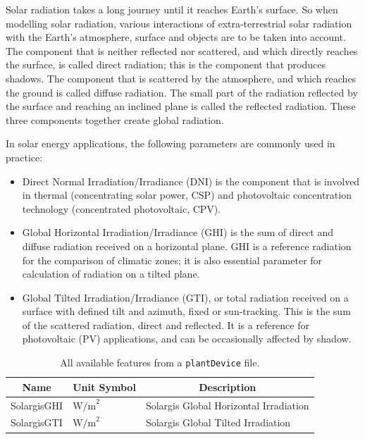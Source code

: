 Solar radiation takes a long journey until it reaches Earth’s surface. So when
modelling solar radiation, various interactions of extra-terrestrial solar
radiation with the Earth’s atmosphere, surface and objects are to be taken into
account. The component that is neither reflected nor scattered, and which
directly
reaches the surface, is called direct radiation; this is the component that
produces shadows. The component that is scattered by the atmosphere, and which
reaches the ground is called diffuse radiation. The small part of the radiation
reflected by the surface and reaching an inclined plane is called the reflected
radiation. These three components together create global radiation.

In solar energy applications, the following parameters are commonly used in
practice:

\begin{itemize}
	\item Direct Normal Irradiation/Irradiance (DNI) is the component that is
	      involved in thermal (concentrating solar power, CSP) and photovoltaic
	      concentration
	      technology (concentrated photovoltaic, CPV).
	\item  Global Horizontal
	      Irradiation/Irradiance (GHI) is the sum of direct and diffuse radiation
	      received on a horizontal plane. GHI is a reference radiation for the
	      comparison of climatic zones; it is also essential parameter for
	      calculation of radiation on a tilted plane.
	\item Global Tilted Irradiation/Irradiance (GTI), or total
	      radiation received on a surface with defined tilt and azimuth, fixed or
	      sun-tracking. This is the sum of the scattered radiation, direct and
	      reflected. It is a reference for photovoltaic (PV) applications, and
	      can be occasionally affected by shadow.
\end{itemize}


\begin{table}[H]
	\begin{center}
		\begin{tabular}[c]{l|l|l}
			\hline
			\multicolumn{1}{c|}{\textbf{Name}}        &
			\multicolumn{1}{c|}{\textbf{Unit Symbol}} &
			\multicolumn{1}{c}{\textbf{Description}}                                                            \\
			\hline
			SolargisGHI                               & $\text{W/m}^2$ & Solargis Global Horizontal Irradiation \\
			SolargisGTI                               & $\text{W/m}^2$ & Solargis Global Tilted Irradiation     \\
			\hline
		\end{tabular}
		\caption{All available features from a \texttt{plantDevice} file.}\label{tab:solargisfeatures}
	\end{center}
\end{table}

